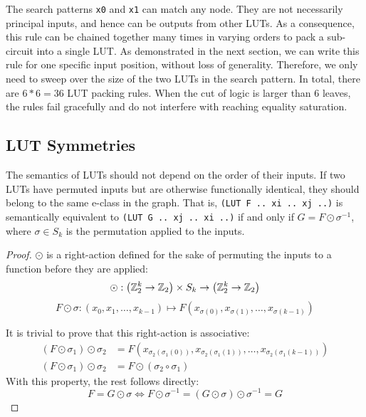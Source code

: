 The search patterns \texttt{x0} and \texttt{x1} can match any node. They are
not necessarily principal inputs, and hence can be outputs from other LUTs. As
a consequence, this rule can be chained together many times in varying orders
to pack a sub-circuit into a single LUT. As demonstrated in the next section,
we can write this rule for one specific input position, without loss of
generality. Therefore, we only need to sweep over the size of the two LUTs in
the search pattern. In total, there are $6*6 = 36$ LUT packing rules. When the
cut of logic is larger than 6 leaves, the rules fail gracefully and do not
interfere with reaching equality saturation.
\subsection{LUT Symmetries}\label{sec:rewrites:symmetry}

The semantics of LUTs should not depend on the order of their inputs. If two
LUTs have permuted inputs but are otherwise functionally identical, they should
belong to the same e-class in the graph. That is, \mbox{\texttt{(LUT F .. xi ..
        xj ..)}} is semantically equivalent to \mbox{\texttt{(LUT G .. xj .. xi ..)}}
if and only if $G = F \odot \sigma^{-1}$, where $\sigma \in S_k$ is the
permutation applied to the inputs.

\begin{proof}
    $\odot$ is a right-action defined for the sake of permuting the inputs to a function before they are applied:
    \begin{equation} \odot : \big (\mathbb{Z}_{2}^{k} \rightarrow \mathbb{Z}_2 \big ) \times S_k \rightarrow \big (\mathbb{Z}_{2}^{k} \rightarrow \mathbb{Z}_2 \big ) \end{equation}
    \begin{equation} F \odot \sigma : (x_0, x_1, \ldots, x_{k-1}) \mapsto F(x_{\sigma(0)}, x_{\sigma(1)}, \ldots, x_{\sigma(k-1)}) \end{equation}

    It is trivial to prove that this right-action is associative:
    \begin{align*}
        (F \odot \sigma_1) \odot \sigma_2 & = F(x_{\sigma_2(\sigma_1(0))}, x_{\sigma_2(\sigma_1(1))}, \ldots, x_{\sigma_2(\sigma_1(k-1))}) \\
        (F \odot \sigma_1) \odot \sigma_2 & = F \odot (\sigma_2 \circ \sigma_1)
    \end{align*}
    With this property, the rest follows directly:
    \begin{equation}
        F = G \odot
        \sigma \iff F \odot \sigma^{-1} = (G \odot \sigma) \odot \sigma^{-1} = G
    \end{equation}
\end{proof}

